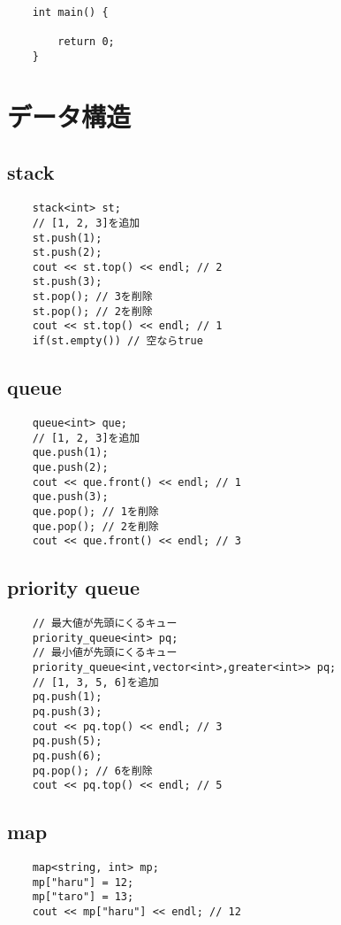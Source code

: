 \documentclass[a4paper, landscape, 9pt]{jarticle} %
\begin{document}
\begin{multicols*}{3}
\begin{lstlisting}
    int main() {
        
        return 0;
    }
    \end{lstlisting}

    \section{データ構造}
    \subsection{stack}
    \begin{lstlisting}
    stack<int> st;
    // [1, 2, 3]を追加
    st.push(1);
    st.push(2);
    cout << st.top() << endl; // 2
    st.push(3);
    st.pop(); // 3を削除
    st.pop(); // 2を削除
    cout << st.top() << endl; // 1
    if(st.empty()) // 空ならtrue
    \end{lstlisting}

    \subsection{queue}
    \begin{lstlisting}
    queue<int> que;
    // [1, 2, 3]を追加
    que.push(1);
    que.push(2);
    cout << que.front() << endl; // 1
    que.push(3);
    que.pop(); // 1を削除
    que.pop(); // 2を削除
    cout << que.front() << endl; // 3
    \end{lstlisting}

    \subsection{priority queue}
    \begin{lstlisting}
    // 最大値が先頭にくるキュー
    priority_queue<int> pq;
    // 最小値が先頭にくるキュー
    priority_queue<int,vector<int>,greater<int>> pq;
    // [1, 3, 5, 6]を追加
    pq.push(1);
    pq.push(3);
    cout << pq.top() << endl; // 3
    pq.push(5);
    pq.push(6);
    pq.pop(); // 6を削除
    cout << pq.top() << endl; // 5
    \end{lstlisting}

    \subsection{map}
    \begin{lstlisting}
    map<string, int> mp;
    mp["haru"] = 12;
    mp["taro"] = 13;
    cout << mp["haru"] << endl; // 12
    \end{lstlisting}


\end{multicols*}
\end{document}
